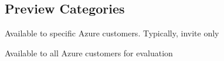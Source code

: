 \documentclass{article}[18pt]
\begin{document}
\subsection{Preview Categories}
\begin{definition}
	Available to specific Azure customers. Typically, invite only
\end{definition}
\begin{definition}
	Available to all Azure customers for evaluation
\end{definition}
\end{document}
